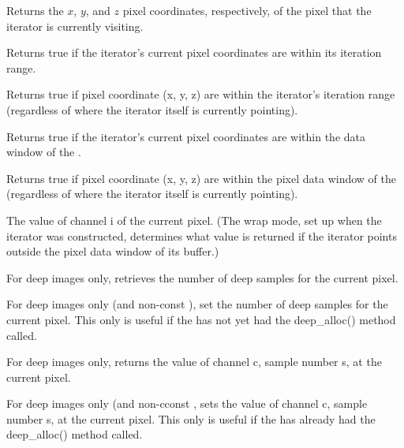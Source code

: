Returns the $x$, $y$, and $z$ pixel coordinates, respectively, of the
pixel that the iterator is currently visiting.
\apiend

Returns {\cf true} if the iterator's current pixel coordinates 
are within its iteration range.
\apiend

Returns {\cf true} if pixel coordinate ({\cf x, y, z}) are within the
iterator's iteration range (regardless of where the iterator itself
is currently pointing).
\apiend

Returns {\cf true} if the iterator's current pixel coordinates 
are within the data window of the \ImageBuf.
\apiend

Returns {\cf true} if pixel coordinate ({\cf x, y, z}) are within the
pixel data window of the \ImageBuf (regardless of where the iterator itself
is currently pointing).
\apiend

The value of channel {\cf i} of the current pixel.  (The wrap
mode, set up when the iterator was constructed, determines what value
is returned if the iterator points outside the pixel data window of
its buffer.)
\apiend

For deep images only, retrieves the number of deep samples for the
current pixel.
\apiend

For deep images only (and non-const \ImageBuf), set the number of deep
samples for the current pixel. This only is useful if the \ImageBuf has
not yet had the {\cf deep_alloc()} method called.
\apiend

For deep images only, returns the value of channel {\cf c}, sample
number {\cf s}, at the current pixel.
\apiend

For deep images only (and non-cconst \ImageBuf, sets the value of channel
{\cf c}, sample number {\cf s}, at the current pixel. This only is useful
if the \ImageBuf has already had the {\cf deep_alloc()} method called.
\apiend

